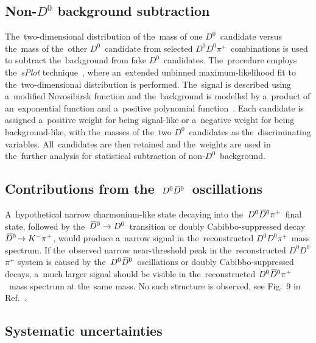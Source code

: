 \documentclass[12pt,a4paper]{article}
\def\Ppi         {\ensuremath{\uppi}\xspace}
\def\PD      {\ensuremath{\mathrm{D}}\xspace}
\def\PK      {\ensuremath{\mathrm{K}}\xspace}
\def\thebaroffset{0.0em}
\def\Ppi         {\ensuremath{\pi}\xspace}
\def\PD      {\ensuremath{D}\xspace}
\def\PK      {\ensuremath{K}\xspace}
\def\thebaroffset{0.18em}
\newcommand{\offsetoverline}[2][\thebaroffset]{\kern #1\overline{\kern -#1 #2}}
\def\pion   {{\ensuremath{\Ppi}}\xspace}
\def\pip    {{\ensuremath{\pion^+}}\xspace}
\def\kaon    {{\ensuremath{\PK}}\xspace}
\def\Km      {{\ensuremath{\kaon^-}}\xspace}
\def\Dbar    {{\ensuremath{\offsetoverline{\PD}}}\xspace}
\def\D       {{\ensuremath{\PD}}\xspace}
\def\Dz      {{\ensuremath{\D^0}}\xspace}
\def\Dzb     {{\ensuremath{\Dbar{}^0}}\xspace}
\newcommand{\decay}[2]{\ensuremath{#1\!\to #2}\xspace}
\def\to                 {\ensuremath{\rightarrow}\xspace}
\def\sPlot{\mbox{\em sPlot}\xspace}
\begin{document}
\subsection*{Non-\Dz background subtraction}

The~two\nobreakdash-dimensional 
distribution of the~mass of 
one \Dz~candidate versus
the~mass of the~other \Dz~candidate from 
selected  $\Dz\Dz\pip$~combinations 
is used to subtract the~background 
from fake \Dz~candidates. 
The~procedure employs 
the~\sPlot technique~\cite{Pivk:2004ty},
where an~extended unbinned 
maximum\nobreakdash-likelihood
fit to the~two\nobreakdash-dimensional 
distribution is performed. 
The~signal is described  
using a~modified 
Novosibirsk function and the~background is modelled
by a~product of 
an~exponential function 
and a~positive polynomial 
function~\cite{LHCb-PAPER-2012-003}. 
Each candidate 
is assigned 
a~positive weight 
for being signal\nobreakdash-like or
a~negative weight for 
being
background\nobreakdash-like, 
with the~masses 
of the~two \Dz~candidates 
as the~discriminating 
variables. 
All~candidates are then retained 
and the~weights are used in 
the~further analysis
for statistical subtraction of 
non\nobreakdash-\Dz~background.

\subsection*{Contributions from the~$\Dz\Dzb$~oscillations}
A~hypothetical narrow 
charmonium\nobreakdash-like  
state decaying into 
the~$\Dz\Dzb\pip$~final state, 
followed by the~$\Dzb\to\Dz$~transition 
or doubly Cabibbo\nobreakdash-suppressed decay
\mbox{$\decay{\Dzb}{\Km\pip}$}, 
would produce a~narrow signal in 
the~reconstructed $\Dz\Dz\pip$~mass spectrum. 
If the~observed narrow 
near\nobreakdash-threshold peak in 
the~reconstructed 
\Dz\Dz\pip system  is caused  
by the~$\Dz\Dzb$~oscillations or 
doubly Cabibbo\nobreakdash-suppressed 
decays, a~much larger signal should be 
visible in the~reconstructed $\Dz\Dzb\pip$~mass spectrum 
at the~same mass.
No such structure 
is observed,
see Fig.~9 in Ref.~\cite{LHCb-PAPER-2021-032}.


\subsection*{Systematic uncertainties} 
\end{document}
